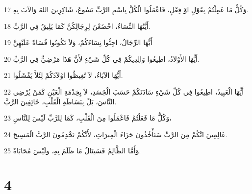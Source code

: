 \par 17 وَكُلُّ مَا عَمِلْتُمْ بِقَوْلٍ اوْ فِعْلٍ، فَاعْمَلُوا الْكُلَّ بِاسْمِ الرَّبِّ يَسُوعَ، شَاكِرِينَ اللهَ وَالآبَ بِهِ.
\par 18 أَيَّتُهَا النِّسَاءُ، اخْضَعْنَ لِرِجَالِكُنَّ كَمَا يَلِيقُ فِي الرَّبِّ.
\par 19 أَيُّهَا الرِّجَالُ، احِبُّوا نِسَاءَكُمْ، وَلاَ تَكُونُوا قُسَاةً عَلَيْهِنَّ
\par 20 أَيُّهَا الأَوْلاَدُ، اطِيعُوا وَالِدِيكُمْ فِي كُلِّ شَيْءٍ لأَنَّ هَذَا مَرْضِيٌّ فِي الرَّبِّ.
\par 21 أَيُّهَا الآبَاءُ، لاَ تُغِيظُوا اوْلاَدَكُمْ لِئَلاَّ يَفْشَلُوا.
\par 22 أَيُّهَا الْعَبِيدُ، اطِيعُوا فِي كُلِّ شَيْءٍ سَادَتَكُمْ حَسَبَ الْجَسَدِ، لاَ بِخِدْمَةِ الْعَيْنِ كَمَنْ يُرْضِي النَّاسَ، بَلْ بِبَسَاطَةِ الْقَلْبِ، خَائِفِينَ الرَّبَّ.
\par 23 وَكُلُّ مَا فَعَلْتُمْ فَاعْمَلُوا مِنَ الْقَلْبِ، كَمَا لِلرَّبِّ لَيْسَ لِلنَّاسِ،
\par 24 عَالِمِينَ انَّكُمْ مِنَ الرَّبِّ سَتَأْخُذُونَ جَزَاءَ الْمِيرَاثِ، لأَنَّكُمْ تَخْدِمُونَ الرَّبَّ الْمَسِيحَ.
\par 25 وَأَمَّا الظَّالِمُ فَسَينَالُ مَا ظَلَمَ بِهِ، ولَيْسَ مُحَابَاةٌ.

\chapter{4}

